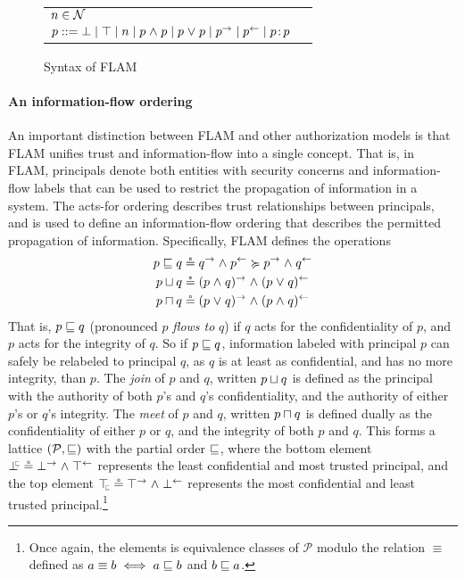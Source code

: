 \begin{figure}
    \centering
    \begin{tabular}{ll}
    $n \in \mathcal{N}$ \\
    $p ::= \bot \mid \top \mid n \mid p \mathrel{\land} p \mid p \mathrel{\lor} p \mid p^{\rightarrow} \mid p^{\leftarrow} \mid p \colon \!p$
    \end{tabular}
    \caption{Syntax of FLAM}
    \label{fig:flam-syntax}
\end{figure}


\paragraph{An information-flow ordering}
An important distinction between FLAM and other authorization models is that FLAM unifies trust and information-flow into a single concept. That is, in FLAM, principals denote both entities with security concerns and information-flow labels that can be used to restrict the propagation of information in a system. The acts-for ordering describes trust relationships between principals, and is used to define an information-flow ordering that describes the permitted propagation of information. Specifically, FLAM defines the operations
\begin{align}
\label{eq:flam-flowsto-from-actsfor} p \flowsto q &\circeq \conf{q} \conj \integ{p} \actsfor \conf{p} \conj \integ{q}\\
p \join q &\circeq \conf{(p \conj q)} \conj \integ{(p \disj q)} \\
p \meet q &\circeq \conf{(p \disj q)} \conj \integ{(p \conj q)}
\end{align}
That is, $p \sqsubseteq q$ (pronounced $p$ \emph{flows to} $q$) if $q$ acts for the confidentiality of $p$, and $p$ acts for the integrity of $q$. So if $p \sqsubseteq q$, information labeled with principal $p$ can safely be relabeled to principal $q$, as $q$ is at least as confidential, and has no more integrity, than $p$. The \emph{join} of $p$ and $q$, written $p \sqcup q$ is defined as the principal with the authority of both $p$'s and $q$'s confidentiality, and the authority of either $p$'s or $q$'s integrity. The \emph{meet} of $p$ and $q$, written $p \sqcap q$ is defined dually as the confidentiality of either $p$ or $q$, and the integrity of both $p$ and $q$.
This forms a lattice $(\mathcal{P}, \sqsubseteq)$ with the partial order $\sqsubseteq$, where the bottom element $\botinfoflow \circeq \conf{\bot} \conj \integ{\top}$ represents the least confidential and most trusted principal, and the top element $\topinfoflow \circeq \conf{\top} \conj \integ{\bot}$ represents the most confidential and least trusted principal.\footnote{Once again, the elements is equivalence classes of $\mathcal{P}$ modulo the relation $\equiv$ defined as $a \equiv b \iff a \sqsubseteq b$ and $b \sqsubseteq a$.}

